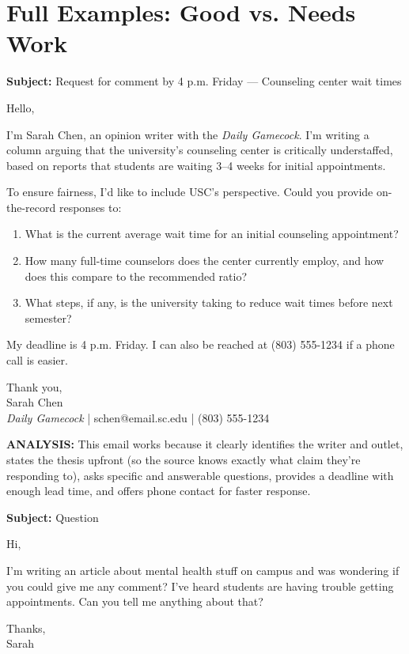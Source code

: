 \documentclass[12pt]{article}
\begin{document}
\section{Full Examples: Good vs. Needs Work}

\begin{goodbox}
\textbf{Subject:} Request for comment by 4 p.m. Friday --- Counseling center wait times

Hello,

I'm Sarah Chen, an opinion writer with the \emph{Daily Gamecock}. I'm writing a column arguing that the university's counseling center is critically understaffed, based on reports that students are waiting 3--4 weeks for initial appointments.

To ensure fairness, I'd like to include USC's perspective. Could you provide on-the-record responses to:

\begin{enumerate}[label=\arabic*.]
  \item What is the current average wait time for an initial counseling appointment?
  \item How many full-time counselors does the center currently employ, and how does this compare to the recommended ratio?
  \item What steps, if any, is the university taking to reduce wait times before next semester?
\end{enumerate}

My deadline is 4 p.m. Friday. I can also be reached at (803) 555-1234 if a phone call is easier.

Thank you,\\
Sarah Chen\\
\emph{Daily Gamecock} | schen@email.sc.edu | (803) 555-1234
\end{goodbox}

\textbf{ANALYSIS:} This email works because it clearly identifies the writer and outlet, states the thesis upfront (so the source knows exactly what claim they're responding to), asks specific and answerable questions, provides a deadline with enough lead time, and offers phone contact for faster response.

\begin{badbox}
\textbf{Subject:} Question

Hi,

I'm writing an article about mental health stuff on campus and was wondering if you could give me any comment? I've heard students are having trouble getting appointments. Can you tell me anything about that?

Thanks,\\
Sarah
\end{badbox}
\end{document}
